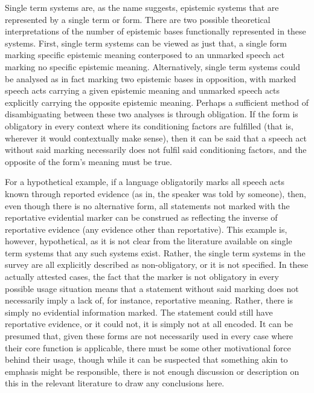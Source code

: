 Single term systems are, as the name suggests, epistemic systems that are represented by a single term or form. There are two possible theoretical interpretations of the number of epistemic bases functionally represented in these systems. First, single term systems can be viewed as just that, a single form marking specific epistemic meaning conterposed to an unmarked speech act marking no specific epistemic meaning. Alternatively, single term systems could be analysed as in fact marking two epistemic bases in opposition, with marked speech acts carrying a given epistemic meaning and unmarked speech acts explicitly carrying the opposite epistemic meaning. Perhaps a sufficient method of disambiguating between these two analyses is through obligation. If the form is obligatory in every context where its conditioning factors are fulfilled (that is, wherever it would contextually make sense), then it can be said that a speech act without said marking necessarily does not fulfil said conditioning factors, and the opposite of the form's meaning must be true.

For a hypothetical example, if a language obligatorily marks all speech acts known through reported evidence (as in, the speaker was told by someone), then, even though there is no alternative form, all statements not marked with the reportative evidential marker can be construed as reflecting the inverse of reportative evidence (any evidence other than reportative). This example is, however, hypothetical, as it is not clear from the literature available on single term systems that any such systems exist. Rather, the single term  systems in the survey are all explicitly described as non-obligatory, or it is not specified. In these actually attested cases, the fact that the marker is not obligatory in every possible usage situation means that a statement without said marking does not necessarily imply a lack of, for instance, reportative meaning. Rather, there is simply no evidential information marked. The statement could still have reportative evidence, or it could not, it is simply not at all encoded. It can be presumed that, given these forms are not necessarily used in every case where their core function is applicable, there must be some other motivational force behind their usage, though while it can be suspected that something akin to emphasis might be responsible, there is not enough discussion or description on this in the relevant literature to draw any conclusions here.


